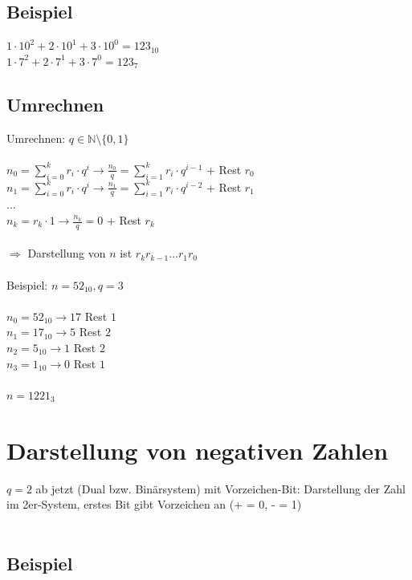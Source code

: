 \documentclass{llncs}
\begin{document}
\subsection*{Beispiel}

$1 \cdot 10^2 + 2 \cdot 10^1 + 3 \cdot 10^0 = 123_{10}$\\
$1 \cdot 7^2 + 2 \cdot 7^1 + 3 \cdot 7^0 = 123_7$

\subsection*{Umrechnen}

Umrechnen: $q \in \mathbb{N} \setminus \{0,1\}$\\
\\
$n_0 = \sum_{i=0}^{k} r_i \cdot q^i \longrightarrow \frac{n_0}{q} = \sum_{i=1}^{k} r_i \cdot q^{i-1}$ + Rest $r_0$\\
$n_1 = \sum_{i=0}^{k} r_i \cdot q^i \longrightarrow \frac{n_1}{q} = \sum_{i=1}^{k} r_i \cdot q^{i-2}$ + Rest $r_1$\\
...\\
$n_k = r_k \cdot 1 \longrightarrow \frac{n_k}{q} = 0$ + Rest $r_k$\\
\\
$\Rightarrow$ Darstellung von $n$ ist $r_k r_{k-1} ... r_1 r_0$\\
\\
Beispiel: $n = 52_{10}, q = 3$\\
\\
$n_0 = 52_{10} \longrightarrow 17$ Rest $1$\\
$n_1 = 17_{10} \longrightarrow  5$ Rest $2$\\
$n_2 =  5_{10} \longrightarrow  1$ Rest $2$\\
$n_3 =  1_{10} \longrightarrow  0$ Rest $1$\\
\\
$n = 1221_3$

\section*{Darstellung von negativen Zahlen}

$q=2$ ab jetzt (Dual bzw. Bin\"arsystem) mit Vorzeichen-Bit: Darstellung der Zahl im 2er-System, erstes Bit gibt Vorzeichen an (+ = 0, - = 1)\\
\\
\subsection{Beispiel}
\end{document}

